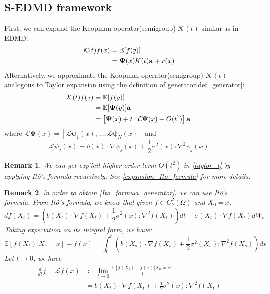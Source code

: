 \documentclass{article}[11]
\newtheorem*{remark}{Remark}
\begin{document}
	\subsection*{S-EDMD framework}
	First, we can expand the Koopman operator(semigroup) $\mathcal{K}(t)$ similar as in EDMD:
	\begin{align}\label{edmd_expansion}
		\mathcal{K}(t) f(x) 
		&= \mathbb{E}[f(y)] \notag\\
		&= \mathbf{\Psi}(x)K(t)\mathbf{a} + r(x) 
	\end{align}
	Alternatively, we approximate the Koopman operator(semigroup) $\mathcal{K}(t)$ analogous to Taylor expansion using the definition of generator\eqref{def_generator}:
	\begin{align}\label{taylor_t}
		\mathcal{K}(t)f(x) &= \mathbb{E}[f(y)] \notag\\
		&= \mathbb{E}[\mathbf{\Psi}(y)]\mathbf{a} \notag\\
		&= \left[ \mathbf{\Psi}(x) + t \cdot \mathcal{L}\mathbf{\Psi}(x) + O(t^2)  \right]\mathbf{a}
	\end{align}
	where $\mathcal{L}\mathbf{\Psi}(x) = \left[ \mathcal{L}\mathbf{\psi}_1(x), \dots, \mathcal{L}\mathbf{\psi}_N(x) \right]$ and
	\begin{equation}\label{Ito_formula_generator}
		\mathcal{L}\psi_j(x) = b(x)\cdot \nabla\psi_j(x) + \frac{1}{2}\sigma^2(x)\colon \nabla^2 \psi_j(x)
	\end{equation}
	\begin{remark}
		We can get explicit higher order term $O(t^2)$ in \eqref{taylor_t} by applying It\^{o}'s formula recursively. See \ref{expansion_Ito_formula} for more details.
	\end{remark}
	\begin{remark}
		In order to obtain \eqref{Ito_formula_generator}, we can use It\^{o}'s formula. From It\^{o}'s formula, we know that given $f\in C_b^2(\Omega)$ and $X_0=x$,
		$$ df(X_t) = \left(b(X_t)\cdot \nabla f(X_t) + \frac{1}{2}\sigma^2(x)\colon \nabla^2 f(X_t)\right)dt + \sigma(X_t)\cdot \nabla f(X_t)dW_t $$
		Taking expectation on its integral form, we have: 
		$$\mathbb{E}[f(X_t)|X_0=x]-f(x) = \int_0^t \left( b(X_s)\cdot \nabla f(X_s) + \frac{1}{2}\sigma^2(X_s)\colon \nabla^2 f(X_s) \right) ds$$
		Let $t \to 0$, we have
		\begin{align*}
			\frac{d}{dt}f = \mathcal{L}f(x) &\coloneqq \lim_{t \to 0} \frac{\mathbb{E}[f(X_t)-f(x)|X_0=x]}{t} \\
			&= b(X_t)\cdot \nabla f(X_t) + \frac{1}{2}\sigma^2(x)\colon \nabla^2 f(X_t)
		\end{align*}
	\end{remark}
\end{document}
